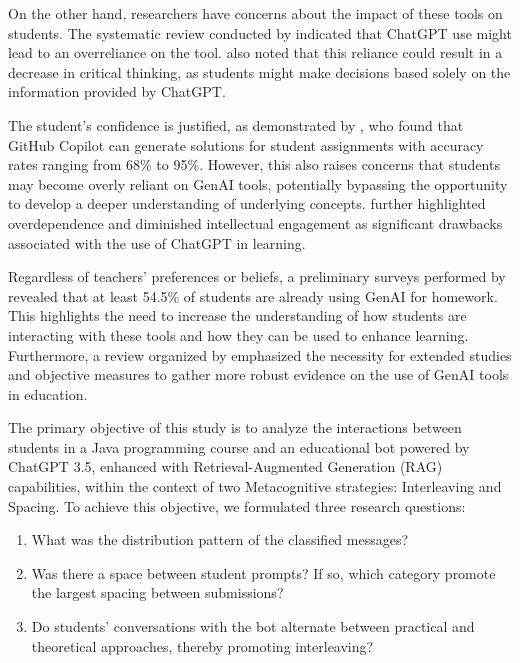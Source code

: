 \documentclass[a4paper,twoside]{article}
\begin{document}
On the other hand, researchers have concerns about the impact of these tools on
students. The systematic review conducted by \cite{Murillo23} indicated that
ChatGPT use might lead to an overreliance on the tool. \cite{chan23} also noted
that this reliance could result in a decrease in critical thinking, as students
might make decisions based solely on the information provided by ChatGPT.

The student’s confidence is justified, as demonstrated by \cite{Puryear22}, who
found that GitHub Copilot can generate solutions for student assignments with
accuracy rates ranging from 68\% to 95\%. However, this also raises concerns
that students may become overly reliant on GenAI tools, potentially bypassing
the opportunity to develop a deeper understanding of underlying concepts.
\cite{cai23} further highlighted overdependence and diminished intellectual
engagement as significant drawbacks associated with the use of ChatGPT in
learning.

Regardless of teachers' preferences or beliefs, a preliminary surveys performed
by \cite{Dickey24} revealed that at least 54.5\% of students are already using
GenAI for homework. This highlights the need to increase the understanding of
how students are interacting with these tools and how they can be used to
enhance learning. Furthermore, a review organized by \cite{Lo24} emphasized the
necessity for extended studies and objective measures to gather more robust
evidence on the use of GenAI tools in education.

The primary objective of this study is to analyze the interactions between
students in a Java programming course and an educational bot powered by
ChatGPT 3.5, enhanced with Retrieval-Augmented Generation (RAG) capabilities,
within the context of two Metacognitive strategies: Interleaving and Spacing.
To achieve this objective, we formulated three research questions:

\begin{enumerate}
  \item What was the distribution pattern of the classified messages?
  \item Was there a space between student prompts? If so, which category promote the largest spacing between submissions?
  \item Do students' conversations with the bot alternate between practical and theoretical approaches, thereby promoting interleaving?
\end{enumerate}

\end{document}
